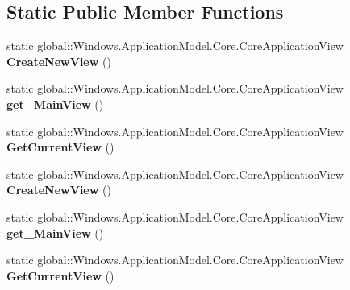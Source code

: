 \subsection*{Static Public Member Functions}
\begin{DoxyCompactItemize}
\item 
\mbox{\label{class_windows_1_1_application_model_1_1_core_1_1_core_application_a4e53b3d6a84ea44252e4cfec6f62e6a4}} 
static global\+::\+Windows.\+Application\+Model.\+Core.\+Core\+Application\+View {\bfseries Create\+New\+View} ()
\item 
\mbox{\label{class_windows_1_1_application_model_1_1_core_1_1_core_application_a1dc848a12769626943e8ba6adec479e6}} 
static global\+::\+Windows.\+Application\+Model.\+Core.\+Core\+Application\+View {\bfseries get\+\_\+\+Main\+View} ()
\item 
\mbox{\label{class_windows_1_1_application_model_1_1_core_1_1_core_application_ab4ec88df76ae8ee8183735b12e8090bf}} 
static global\+::\+Windows.\+Application\+Model.\+Core.\+Core\+Application\+View {\bfseries Get\+Current\+View} ()
\item 
\mbox{\label{class_windows_1_1_application_model_1_1_core_1_1_core_application_a4e53b3d6a84ea44252e4cfec6f62e6a4}} 
static global\+::\+Windows.\+Application\+Model.\+Core.\+Core\+Application\+View {\bfseries Create\+New\+View} ()
\item 
\mbox{\label{class_windows_1_1_application_model_1_1_core_1_1_core_application_a1dc848a12769626943e8ba6adec479e6}} 
static global\+::\+Windows.\+Application\+Model.\+Core.\+Core\+Application\+View {\bfseries get\+\_\+\+Main\+View} ()
\item 
\mbox{\label{class_windows_1_1_application_model_1_1_core_1_1_core_application_ab4ec88df76ae8ee8183735b12e8090bf}} 
static global\+::\+Windows.\+Application\+Model.\+Core.\+Core\+Application\+View {\bfseries Get\+Current\+View} ()

\end{DoxyCompactItemize}
